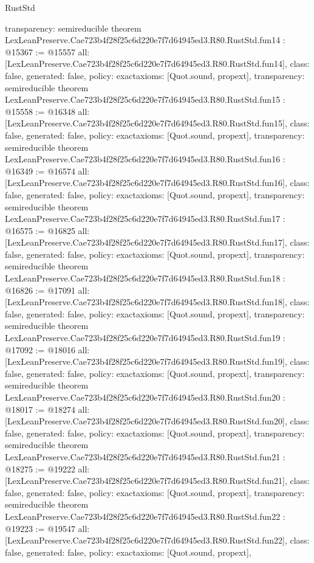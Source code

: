 \begin{lexlean}{RustStd}
\begin{coremodule}
{  transparency: semireducible
}
theorem LexLeanPreserve.Cae723b4f28f25c6d220e7f7d64945ed3.R80.RustStd.fun14 : @15367 := @15557 {
  all: [LexLeanPreserve.Cae723b4f28f25c6d220e7f7d64945ed3.R80.RustStd.fun14],
  class: false,
  generated: false,
  policy: exact{axioms: [Quot.sound, propext]},
  transparency: semireducible
}
theorem LexLeanPreserve.Cae723b4f28f25c6d220e7f7d64945ed3.R80.RustStd.fun15 : @15558 := @16348 {
  all: [LexLeanPreserve.Cae723b4f28f25c6d220e7f7d64945ed3.R80.RustStd.fun15],
  class: false,
  generated: false,
  policy: exact{axioms: [Quot.sound, propext]},
  transparency: semireducible
}
theorem LexLeanPreserve.Cae723b4f28f25c6d220e7f7d64945ed3.R80.RustStd.fun16 : @16349 := @16574 {
  all: [LexLeanPreserve.Cae723b4f28f25c6d220e7f7d64945ed3.R80.RustStd.fun16],
  class: false,
  generated: false,
  policy: exact{axioms: [Quot.sound, propext]},
  transparency: semireducible
}
theorem LexLeanPreserve.Cae723b4f28f25c6d220e7f7d64945ed3.R80.RustStd.fun17 : @16575 := @16825 {
  all: [LexLeanPreserve.Cae723b4f28f25c6d220e7f7d64945ed3.R80.RustStd.fun17],
  class: false,
  generated: false,
  policy: exact{axioms: [Quot.sound, propext]},
  transparency: semireducible
}
theorem LexLeanPreserve.Cae723b4f28f25c6d220e7f7d64945ed3.R80.RustStd.fun18 : @16826 := @17091 {
  all: [LexLeanPreserve.Cae723b4f28f25c6d220e7f7d64945ed3.R80.RustStd.fun18],
  class: false,
  generated: false,
  policy: exact{axioms: [Quot.sound, propext]},
  transparency: semireducible
}
theorem LexLeanPreserve.Cae723b4f28f25c6d220e7f7d64945ed3.R80.RustStd.fun19 : @17092 := @18016 {
  all: [LexLeanPreserve.Cae723b4f28f25c6d220e7f7d64945ed3.R80.RustStd.fun19],
  class: false,
  generated: false,
  policy: exact{axioms: [Quot.sound, propext]},
  transparency: semireducible
}
theorem LexLeanPreserve.Cae723b4f28f25c6d220e7f7d64945ed3.R80.RustStd.fun20 : @18017 := @18274 {
  all: [LexLeanPreserve.Cae723b4f28f25c6d220e7f7d64945ed3.R80.RustStd.fun20],
  class: false,
  generated: false,
  policy: exact{axioms: [Quot.sound, propext]},
  transparency: semireducible
}
theorem LexLeanPreserve.Cae723b4f28f25c6d220e7f7d64945ed3.R80.RustStd.fun21 : @18275 := @19222 {
  all: [LexLeanPreserve.Cae723b4f28f25c6d220e7f7d64945ed3.R80.RustStd.fun21],
  class: false,
  generated: false,
  policy: exact{axioms: [Quot.sound, propext]},
  transparency: semireducible
}
theorem LexLeanPreserve.Cae723b4f28f25c6d220e7f7d64945ed3.R80.RustStd.fun22 : @19223 := @19547 {
  all: [LexLeanPreserve.Cae723b4f28f25c6d220e7f7d64945ed3.R80.RustStd.fun22],
  class: false,
  generated: false,
  policy: exact{axioms: [Quot.sound, propext]},
}
\end{coremodule}
\end{lexlean}
